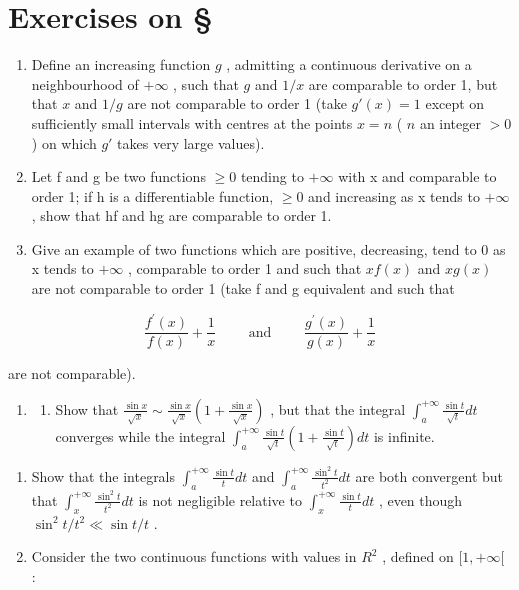 \section*{Exercises on \S{}}
{}

\begin{enumerate}
\def\labelenumi{\arabic{enumi})}
\item
  Define an increasing function \(g\) , admitting a continuous derivative on a neighbourhood of \(+\infty\) , such that \(g\) and \(1 / x\) are comparable to order 1, but that \(x\) and \(1 / g\) are not comparable to order 1 (take \(g'(x) = 1\) except on sufficiently small intervals with centres at the points \(x = n\) ( \(n\) an integer \(>0\) ) on which \(g'\) takes very large values).
\item
  Let f and g be two functions \(\geqslant0\) tending to \(+\infty\) with x and comparable to order 1; if h is a differentiable function, \(\geqslant0\) and increasing as x tends to \(+\infty\) , show that hf and hg are comparable to order 1.
\item
  Give an example of two functions which are positive, decreasing, tend to 0 as x tends to \(+\infty\) , comparable to order 1 and such that \(xf(x)\) and \(xg(x)\) are not comparable to order 1 (take f and g equivalent and such that
\end{enumerate}

\[
\frac {f ^ {\prime} (x)}{f (x)} + \frac {1}{x} \qquad \text { and } \qquad \frac {g ^ {\prime} (x)}{g (x)} + \frac {1}{x}
\]

are not comparable).

\begin{enumerate}
\def\labelenumi{\arabic{enumi})}
\setcounter{enumi}{3}
\tightlist
\item
  \begin{enumerate}
  \def\labelenumii{\alph{enumii})}
  \tightlist
  \item
    Show that \(\frac{\sin x}{\sqrt{x}} \sim \frac{\sin x}{\sqrt{x}} \left(1 + \frac{\sin x}{\sqrt{x}}\right)\) , but that the integral \(\int_{a}^{+\infty} \frac{\sin t}{\sqrt{t}} dt\) converges while the integral \(\int_{a}^{+\infty} \frac{\sin t}{\sqrt{t}} \left(1 + \frac{\sin t}{\sqrt{t}}\right) dt\) is infinite.
  \end{enumerate}
\end{enumerate}

\begin{enumerate}
\def\labelenumi{\alph{enumi})}
\setcounter{enumi}{1}
\item
  Show that the integrals \(\int_{a}^{+\infty}\frac{\sin t}{t}dt\) and \(\int_{a}^{+\infty}\frac{\sin^{2}t}{t^{2}}dt\) are both convergent but that \(\int_{x}^{+\infty}\frac{\sin^{2}t}{t^{2}}dt\) is not negligible relative to \(\int_{x}^{+\infty}\frac{\sin t}{t}dt\) , even though \(\sin^{2}t/t^{2}\ll\sin t/t\) .
\item
  Consider the two continuous functions with values in \(R^{2}\) , defined on \([1, +\infty[\) :
\end{enumerate}

